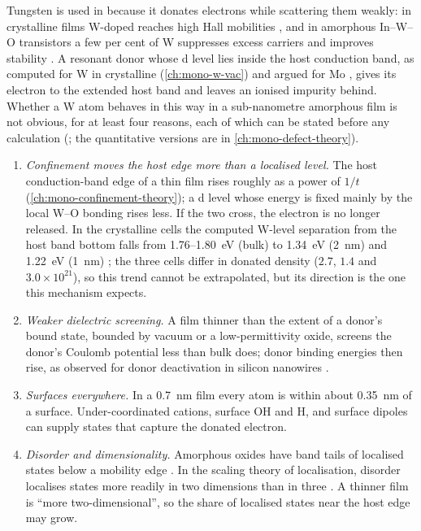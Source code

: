 Tungsten is used in \InO{} because it donates electrons while scattering them weakly: in crystalline films W-doped
\InO{} reaches high Hall mobilities \citep{Newhouse2005}, and in amorphous In--W--O transistors a few per cent of W
suppresses excess carriers and improves stability \citep{Kizu2014}. A resonant donor whose d level lies inside the
host conduction band, as computed for W in crystalline \InO{} (\cref{ch:mono-w-vac}) and argued for Mo
\citep{Swallow2020}, gives its electron to the extended host band and leaves an ionised impurity behind. Whether a
W atom behaves in this way in a sub-nanometre amorphous film is not obvious, for at least four reasons, each of which
can be stated before any calculation (; the quantitative versions are in \cref{ch:mono-defect-theory}).

\begin{enumerate}
\item \emph{Confinement moves the host edge more than a localised level.} The host conduction-band edge of a thin film
rises roughly as a power of $1/t$ (\cref{ch:mono-confinement-theory}); a d level whose energy is fixed mainly by the
local W--O bonding rises less. If the two cross, the electron is no longer released. In the crystalline cells the
computed W-level separation from the host band bottom falls from 1.76--1.80~eV (bulk) to 1.34~eV (2~nm) and 1.22~eV
(1~nm) ; the three cells differ in donated density ($2.7$, $1.4$ and $3.0\times10^{21}$\cmcu{}), so this
trend cannot be extrapolated, but its direction is the one this mechanism expects.
\item \emph{Weaker dielectric screening.} A film thinner than the extent of a donor's bound state, bounded by vacuum or
a low-permittivity oxide, screens the donor's Coulomb potential less than bulk does; donor binding energies then rise,
as observed for donor deactivation in silicon nanowires \citep{Diarra2007,Bjork2009}.
\item \emph{Surfaces everywhere.} In a 0.7~nm film every atom is within about 0.35~nm of a surface. Under-coordinated
cations, surface OH and H, and surface dipoles can supply states that capture the donated electron.
\item \emph{Disorder and dimensionality.} Amorphous oxides have band tails of localised states below a mobility edge
\citep{Mott1969,Medvedeva2017}. In the scaling theory of localisation, disorder localises states more readily in two
dimensions than in three \citep{Abrahams1979,Anderson1958}. A thinner film is ``more two-dimensional'', so the share of
localised states near the host edge may grow.
\end{enumerate}

